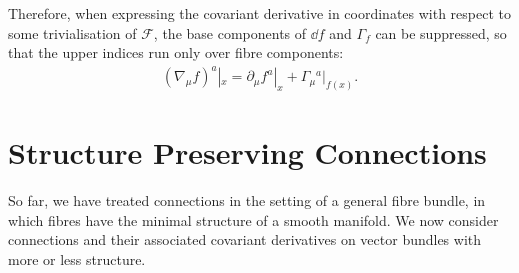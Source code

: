 Therefore, when expressing the covariant derivative in coordinates with respect to some trivialisation of $ℱ$, the base components of $\dd f$ and $Γ_f$ can be suppressed, so that the upper indices run only over fibre components:
\begin{align}
	(∇_μ f)^a|_x = ∂_μ f^a|_x + Γ_μ{}^a |_{f(x)}
.\end{align}





\section{Structure Preserving Connections}

So far, we have treated connections in the setting of a general fibre bundle, in which fibres have the minimal structure of a smooth manifold.
We now consider connections and their associated covariant derivatives on vector bundles with more or less structure.

